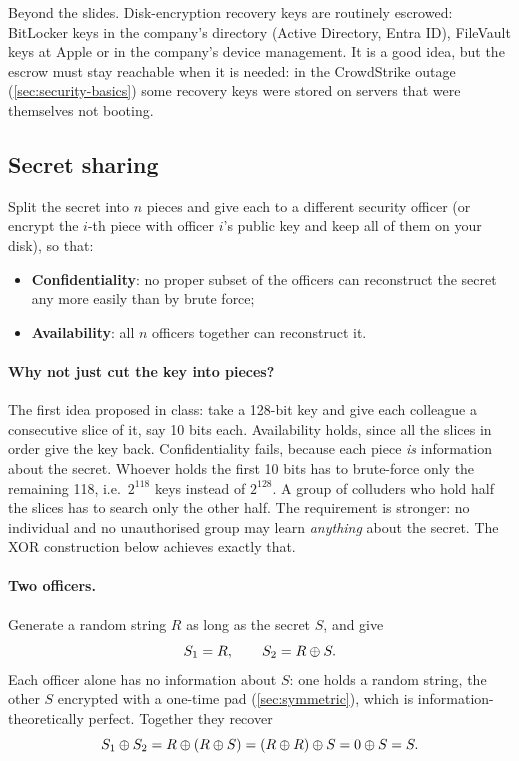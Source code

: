 \begin{remark}
Beyond the slides. Disk-encryption recovery keys are routinely escrowed: BitLocker keys in the company's directory (Active Directory, Entra ID), FileVault keys at Apple or in the company's device management. It is a good idea, but the escrow must stay reachable when it is needed: in the CrowdStrike outage (\cref{sec:security-basics}) some recovery keys were stored on servers that were themselves not booting.
\end{remark}

\subsection{Secret sharing}

Split the secret into $n$ pieces and give each to a different security officer (or encrypt the $i$-th piece with officer $i$'s public key and keep all of them on your disk), so that:
\begin{itemize}
    \item \textbf{Confidentiality}: no proper subset of the officers can reconstruct the secret any more easily than by brute force;
    \item \textbf{Availability}: all $n$ officers together can reconstruct it.
\end{itemize}

\paragraph{Why not just cut the key into pieces?} The first idea proposed in class: take a 128-bit key and give each colleague a consecutive slice of it, say 10 bits each. Availability holds, since all the slices in order give the key back. Confidentiality fails, because each piece \emph{is} information about the secret. Whoever holds the first 10 bits has to brute-force only the remaining 118, i.e.\ $2^{118}$ keys instead of $2^{128}$. A group of colluders who hold half the slices has to search only the other half. The requirement is stronger: no individual and no unauthorised group may learn \emph{anything} about the secret. The XOR construction below achieves exactly that.

\paragraph{Two officers.} Generate a random string $R$ as long as the secret $S$, and give
\[
    S_1 = R, \qquad S_2 = R \oplus S.
\]
Each officer alone has no information about $S$: one holds a random string, the other $S$ encrypted with a one-time pad (\cref{sec:symmetric}), which is information-theoretically perfect. Together they recover
\[
    S_1 \oplus S_2 = R \oplus (R \oplus S) = (R \oplus R) \oplus S = 0 \oplus S = S.
\]

